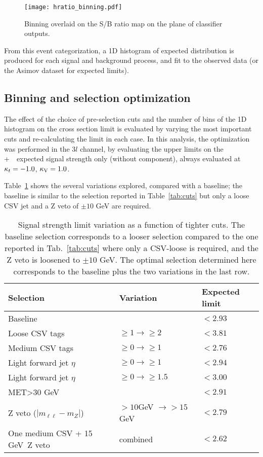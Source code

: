 \begin{figure} [!h]
 \centering
 \texttt{[image: hratio\_binning.pdf]}
\caption{Binning overlaid on the S/B ratio map on the plane of classifier outputs.}
\label{fig:binning}
\end{figure}

From this event categorization, a 1D histogram of expected distribution is produced for each signal and background process, and fit to the observed data (or the Asimov dataset for expected limits).

\subsection{Binning and selection optimization}\label{sec:binopt}

The effect of the choice of pre-selection cuts and the number of bins of the 1D histogram on the cross section limit is evaluated by varying the most important cuts and re-calculating the limit in each case. In this analysis, the optimization was performed in the $3l$ channel, by evaluating the upper limits on the \tHq+\ \tHW\ expected signal strength only (without \ttH component), always evaluated at $\kappa_t=-1.0$, $\kappa_\text{V}=1.0$.

Table~\ref{cut_limit} shows the several variations explored, compared with a baseline; the baseline is similar to the selection reported in Table~\ref{tab:cuts} but only a loose CSV jet and a Z veto of $\pm10$ GeV are required. 

\begin{table}[h!]
\centering
\begin{tabular}{lll}
Selection                         & Variation                & Expected limit \\ \hline
Baseline                          &                          & $<2.93$\\
Loose CSV tags                    & $\geq 1 \to \geq 2$      & $<3.81$\\
Medium CSV tags                   & $\geq 0 \to \geq 1$      & $<2.76$\\
Light forward jet $\eta$          & $\geq 0 \to \geq 1$      & $<2.94$\\
Light forward jet $\eta$          & $\geq 0 \to \geq 1.5$    & $<3.00$\\
MET>30 GeV                        &                          & $<2.91$\\
Z veto ($|m_{\ell\ell}-m_Z|$)     & $>10$GeV $\to >15$ GeV   & $<2.79$\\
One medium CSV + 15 GeV\ Z veto   & combined                 & $<2.62$\\\hline
\end{tabular}
\caption[Selection cuts optimization.]{Signal strength limit variation as a function of tighter cuts. The baseline selection corresponds to a looser selection compared to the one reported in Tab.~\ref{tab:cuts} where only a CSV-loose \bjet is required, and the Z veto is loosened to $\pm10$ GeV. The optimal selection determined here corresponds to the baseline plus the two variations in the last row.}
\label{cut_limit}
\end{table}


